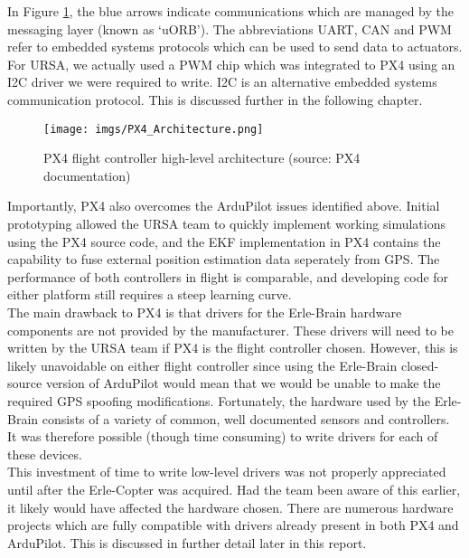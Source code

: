 \documentclass[capstone_report.tex]{subfiles}
\begin{document}
In Figure \ref{fig:PX4Arch}, the blue arrows indicate communications which are managed by the messaging layer (known as `uORB'). The abbreviations UART, CAN and PWM refer to embedded systems protocols which can be used to send data to actuators. For URSA, we actually used a PWM chip which was integrated to PX4 using an I2C driver we were required to write. I2C is an alternative embedded systems communication protocol. This is discussed further in the following chapter.\\

\begin{figure}[H]
    \centering
    \texttt{[image: imgs/PX4\_Architecture.png]}
    \caption{PX4 flight controller high-level architecture (source: PX4 documentation)\label{fig:PX4Arch}}
\end{figure}

Importantly, PX4 also overcomes the ArduPilot issues identified above. Initial prototyping allowed the URSA team to quickly implement working simulations using the PX4 source code, and the EKF implementation in PX4 contains the capability to fuse external position estimation data seperately from GPS. The performance of both controllers in flight is comparable, and developing code for either platform still requires a steep learning curve. \\

The main drawback to PX4 is that drivers for the Erle-Brain hardware components are not provided by the manufacturer. These drivers will need to be written by the URSA team if PX4 is the flight controller chosen. However, this is likely unavoidable on either flight controller since using the Erle-Brain closed-source version of ArduPilot would mean that we would be unable to make the required GPS spoofing modifications. Fortunately, the hardware used by the Erle-Brain consists of a variety of common, well documented sensors and controllers. It was therefore possible (though time consuming) to write drivers for each of these devices.\\

This investment of time to write low-level drivers was not properly appreciated until after the Erle-Copter was acquired. Had the team been aware of this earlier, it likely would have affected the hardware chosen. There are numerous hardware projects which are fully compatible with drivers already present in both PX4 and ArduPilot. This is discussed in further detail later in this report.\\
\end{document}
